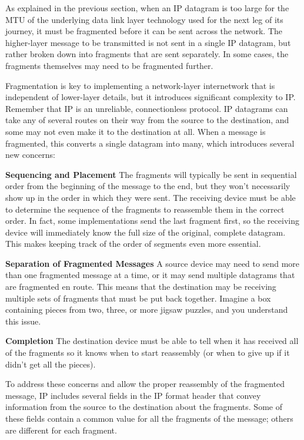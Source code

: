 As explained in the previous section, when an IP datagram is too large
for the MTU of the underlying data link layer technology used for the
next leg of its journey, it must be fragmented before it can be sent
across the network. The higher-layer message to be transmitted is not
sent in a single IP datagram, but rather broken down into fragments that
are sent separately. In some cases, the fragments themselves may need to
be fragmented further.

Fragmentation is key to implementing a network-layer internetwork that is independent
of lower-layer details, but it introduces significant complexity to IP.
Remember that IP is an unreliable, connectionless protocol. IP datagrams
can take any of several routes on their way from the source to the
destination, and some may not even make it to the destination at all.
When a message is fragmented, this converts a single datagram into many,
which introduces several new concerns:

{\textbf{Sequencing and Placement}} The fragments will typically be sent
in sequential order from the beginning of the message to the end, but
they won't necessarily show up in the order in which they were sent. The
receiving device must be able to determine the sequence of the fragments
to reassemble them in the correct order. In fact, some implementations
send the last fragment first, so the receiving device will immediately
know the full size of the original, complete datagram. This makes
keeping track of the order of segments even more essential.

{\textbf{Separation of Fragmented Messages}} A source device may need to
send more than one fragmented message at a time, or it may send multiple
datagrams that are fragmented en route. This means that the destination
may be receiving multiple sets of fragments that must be put back
together. Imagine a box containing pieces from two, three, or more
jigsaw puzzles, and you understand this issue.

{\textbf{Completion}} The destination device must be able to tell when
it has received all of the fragments so it knows when to start
reassembly (or when to give up if it didn't get all the pieces).

To address these concerns and allow the proper reassembly of the
fragmented message, IP includes several fields in the IP format header
that convey information from the source to the destination about the
fragments. Some of these fields contain a common value for all the
fragments of the message; others are different for each fragment.




